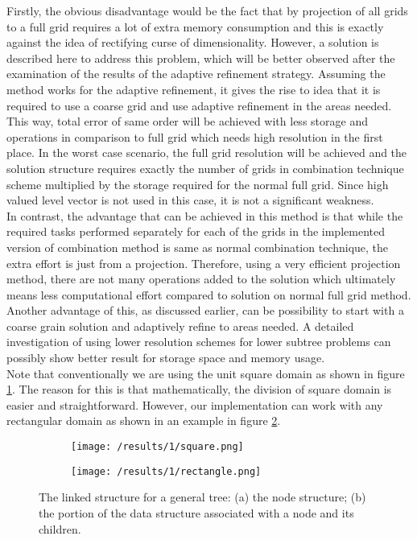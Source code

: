 Firstly, the obvious disadvantage would be the fact that by projection of all grids to a full grid requires a lot of extra memory consumption and this is exactly against the idea of rectifying curse of dimensionality. However, a solution is described here to address this problem, which will be better observed after the examination of the results of the adaptive refinement strategy. Assuming the method works for the adaptive refinement, it gives the rise to idea that it is required to use a coarse grid and use adaptive refinement in the areas needed. This way, total error of same order will be achieved with less storage and operations in comparison to full grid which needs high resolution in the first place. In the worst case scenario, the full grid resolution will be achieved and the solution structure requires exactly the number of grids in combination technique scheme multiplied by the storage required for the normal full grid. Since high valued level vector is not used in this case, it is not a significant weakness.\\

In contrast, the advantage that can be achieved in this method is that while the required tasks performed separately for each of the grids in the implemented version of combination method is same as normal combination technique, the extra effort is just from a projection. Therefore, using a very efficient projection method, there are not many operations added to the solution which ultimately means less computational effort compared to solution on normal full grid method. Another advantage of this, as discussed earlier, can be possibility to start with a coarse grain solution and adaptively refine to areas needed. A detailed investigation of using lower resolution schemes for lower subtree problems can possibly show better result for storage space and memory usage. \\

Note that conventionally we are using the unit square domain as shown in figure \ref{fig:results1Square}. The reason for this is that mathematically, the division of square domain is easier and straightforward. However, our implementation can work with any rectangular domain as shown in an example in figure \ref{fig:results1Rect}. 

\begin{figure}[h]
	\centering
    \begin{subfigure}[b]{0.49\textwidth}    
	    \texttt{[image: /results/1/square.png]}
		\centering    
	 \caption{}
	 \label{fig:results1Square}
    \end{subfigure} 
    \begin{subfigure}[b]{0.49\textwidth}
	    \texttt{[image: /results/1/rectangle.png]}
		\centering
        \caption{}
        \label{fig:results1Rect}
    \end{subfigure}     
    \caption{The linked structure for a general tree: (a) the node structure; (b) the portion of the data structure associated with a node and its children.}
    \label{fig:results1SquareRect}
\end{figure}

